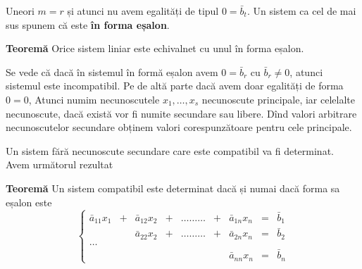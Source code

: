 \documentclass[11pt]{article}
\makeatletter
\newcommand{\boxspacing}{\kern\kvtcb@left@rule\kern\kvtcb@boxsep}
\newcommand{\prompt}[4]{
        {\ttfamily\llap{{\color{#2}[#3]:\hspace{3pt}#4}}\vspace{-\baselineskip}}
    }
\makeatother
\begin{document}
Uneori \(m=r\) și atunci nu avem egalități de tipul \(0=\bar{b}_t\). Un
sistem ca cel de mai sus spunem că este \textbf{în forma eșalon}.

\textbf{Teoremă} Orice sistem liniar este echivalnet cu unul în forma
eșalon.

Se vede că dacă în sistemul în formă eșalon avem \(0=\bar{b}_r\) cu
\(\bar{b}_r \neq 0\), atunci sistemul este incompatibil. Pe de altă
parte dacă avem doar egalități de forma \(0=0\), Atunci numim
necunoscutele \(x_1,\dots,x_s\) necunoscute principale, iar celelalte
necunoscute, dacă există vor fi numite secundare sau libere. Dînd valori
arbitrare necunoscutelor secundare obținem valori corespunzătoare pentru
cele principale.

Un sistem fără necunoscute secundare care este compatibil va fi
determinat. Avem următorul rezultat

\textbf{Teoremă} Un sistem compatibil este determinat dacă și numai dacă
forma sa eșalon este \[
  \left\{\begin{matrix} \bar{a}_{11} x_1 & + & \bar{a}_{12}x_2 & + & \dots  \dots  \dots & + & \bar{a}_{1n}x_n & = & \bar{b}_1 \\
 & & \bar{a}_{22}x_2 & + & \dots  \dots  \dots & + & \bar{a}_{2n}x_n & = & \bar{b}_2 \\
 \ldots \\
  & & & & & & \bar{a}_{nn}x_n & = & \bar{b}_n
 \end{matrix} \right.
 \]

    \begin{tcolorbox}[breakable, size=fbox, boxrule=1pt, pad at break*=1mm,colback=cellbackground, colframe=cellborder]
\prompt{In}{incolor}{ }{\boxspacing}
\begin{Verbatim}[commandchars=\\\{\}]

\end{Verbatim}
\end{tcolorbox}


    
    
    
\end{document}
